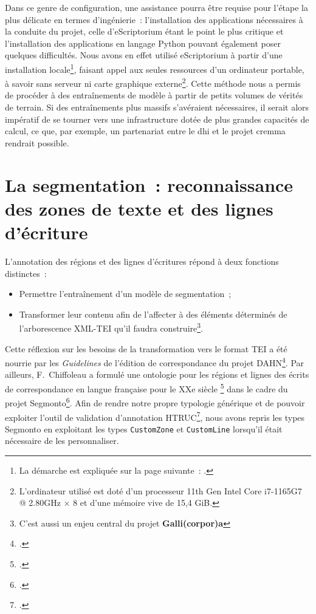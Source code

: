 \documentclass[a4paper,12pt,twoside]{book}
\begin{document}
			Dans ce genre de configuration, une assistance pourra être requise pour l'étape la plus délicate en termes d'ingénierie~: l'installation des applications nécessaires à la conduite du projet, celle d'eScriptorium étant le point le plus critique et l'installation des applications en langage Python pouvant également poser quelques difficultés. Nous avons en effet utilisé eScriptorium à partir d'une installation locale\footnote{La démarche est expliquée sur la page suivante~: \cite{DockerInstallInstallation}.}, faisant appel aux seules ressources d'un ordinateur portable, à savoir sans serveur ni carte graphique externe\footnote{L'ordinateur utilisé est doté d'un processeur 11th Gen Intel Core i7-1165G7 @ 2.80GHz × 8 et d'une mémoire vive de 15,4 GiB.}. Cette méthode nous a permis de procéder à des entraînements de modèle à partir de petits volumes de vérités de terrain. Si des entraînements plus massifs s'avéraient nécessaires, il serait alors impératif de se tourner vers une infrastructure dotée de plus grandes capacités de calcul, ce que, par exemple, un partenariat entre le \gls{dhi} et le projet \gls{cremma} rendrait possible.
						
		\section[La segmentation]{La segmentation~: reconnaissance des zones de texte et des lignes d'écriture}
			\label{segmentation}
			
			L'annotation des régions et des lignes d'écritures répond à deux fonctions distinctes~:
			
			\begin{itemize}
				\item Permettre l'entraînement d'un modèle de segmentation~;
				\item Transformer leur contenu afin de l'affecter à des éléments déterminés de l'arborescence XML-TEI qu'il faudra construire\footnote{C'est aussi un enjeu central du projet \textbf{Galli(corpor)a}}.
			\end{itemize}

				Cette réflexion sur les besoins de la transformation vers le format TEI a été nourrie par les \textit{Guidelines} de l'édition de correspondance du projet DAHN\footcite{chiffoleauCorrespondenceGuidelines2022}. Par ailleurs, F.~Chiffoleau a formulé une ontologie pour les régions et lignes des écrits de correspondance en langue française pour le XXe siècle \footcite{chiffoleauCorrespondanceLangueFrancaise2021} dans le cadre du projet \gls{Segmonto}\footcite{gabaySegmOntoCommonVocabulary2021}. Afin de rendre notre propre typologie générique et de pouvoir exploiter l'outil de validation d'annotation HTRUC\footcite{clericeHTRUCHTRUnitedCatalog2021}, nous avons repris les types \gls{Segmonto} en exploitant les types \texttt{CustomZone} et \texttt{CustomLine} lorsqu'il était nécessaire de les personnaliser.
\end{document}
